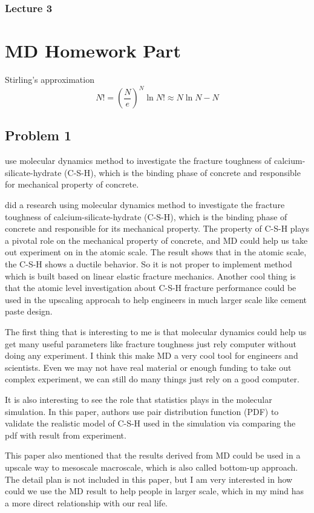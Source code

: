 \documentclass[a4paper]{article}
\begin{document}
\subsubsection{Lecture 3}

\bigskip
\section{MD Homework Part}
Stirling's approximation 
\begin{equation}
	N! = (\frac{N}{e})^{N}
	\ln N! \approx N\ln N- N
\end{equation}

\subsection{Problem 1}
use molecular dynamics method to investigate the fracture toughness of calcium-silicate-hydrate (C-S-H), which is the binding phase of concrete and responsible for mechanical property of concrete.

did a research using molecular dynamics method to investigate the fracture toughness of calcium-silicate-hydrate (C-S-H), which is the binding phase of concrete and responsible for its mechanical property. The property of C-S-H plays a pivotal role on the mechanical property of concrete, and MD could help us take out experiment on in the atomic scale. 
The result shows that in the atomic scale, the C-S-H shows a ductile behavior. So it is not proper to implement method which is built based on linear elastic fracture mechanics. Another cool thing is that the atomic level investigation about C-S-H fracture performance could be used in the upscaling approcah to help engineers in much larger scale like cement paste design.

The first thing that is interesting to me is that molecular dynamics could help us get many useful parameters like fracture toughness just rely computer without doing any experiment. I think this make MD a very cool tool for engineers and scientists. Even we may not have real material or enough funding to take out complex experiment, we can still do many things just rely on a good computer.

It is also interesting to see the role that statistics plays in the molecular simulation. In this paper, authors use pair distribution function (PDF) to validate the realistic model of C-S-H used in the simulation via comparing the pdf with result from experiment.

This paper also mentioned that the results derived from MD could be used in a upscale way to mesoscale macroscale, which is also called bottom-up approach. The detail plan is not included in this paper, but I am very interested in how could we use the MD result to help people in larger scale, which in my mind has a more direct relationship with our real life.
\end{document}
